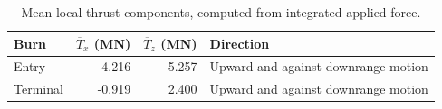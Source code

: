 \begin{table}[htbp]
\centering\small
\caption{Mean local thrust components, computed from integrated applied force.}
\label{tab:force}
\begin{tabularx}{\linewidth}{@{}lrrX@{}}
\toprule
Burn & $\overline T_x$ (MN) & $\overline T_z$ (MN) & Direction \\
\midrule
Entry & -4.216 & 5.257 & Upward and against downrange motion \\
Terminal & -0.919 & 2.400 & Upward and against downrange motion \\
\bottomrule
\end{tabularx}
\par{}
\end{table}
